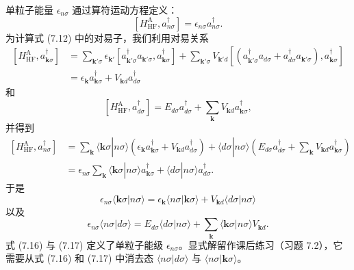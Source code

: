单粒子能量 $\epsilon_{n\sigma}$ 通过算符运动方程定义：
\begin{equation*}
\left[H_{\mathrm{HF}}^{\mathrm{A}},a_{n\sigma}^{\dagger}\right]=\epsilon_{n\sigma}a_{n\sigma}^{\dagger}.\tag{7.12}
\end{equation*}
为计算式 (7.12) 中的对易子，我们利用对易关系
\begin{equation*}
\begin{aligned}
\left[H_{\mathrm{HF}}^{\mathrm{A}},a_{\mathbf{k}\sigma}^{\dagger}\right]&=\sum_{\mathbf{k}'\sigma}\epsilon_{\mathbf{k}'}\left[a_{\mathbf{k}'\sigma}^{\dagger}a_{\mathbf{k}'\sigma},a_{\mathbf{k}\sigma}^{\dagger}\right]+\sum_{\mathbf{k}'\sigma}V_{\mathbf{k}'d}\left[\left(a_{\mathbf{k}'\sigma}^{\dagger}a_{d\sigma}+a_{d\sigma}^{\dagger}a_{\mathbf{k}'\sigma}\right),a_{\mathbf{k}\sigma}^{\dagger}\right]\\
&=\epsilon_{\mathbf{k}}a_{\mathbf{k}\sigma}^{\dagger}+V_{\mathbf{k}d}a_{d\sigma}^{\dagger}
\end{aligned}\tag{7.13}
\end{equation*}
和
\begin{equation*}
\left[H_{\mathrm{HF}}^{\mathrm{A}},a_{d\sigma}^{\dagger}\right]=E_{d\sigma}a_{d\sigma}^{\dagger}+\sum_{\mathbf{k}}V_{\mathbf{k}d}a_{\mathbf{k}\sigma}^{\dagger},\tag{7.14}
\end{equation*}
并得到
\begin{equation*}
\begin{aligned}
\left[H_{\mathrm{HF}}^{\mathrm{A}},a_{n\sigma}^{\dagger}\right]&=\sum_{\mathbf{k}}\langle\mathbf{k}\sigma|n\sigma\rangle\left(\epsilon_{\mathbf{k}}a_{\mathbf{k}\sigma}^{\dagger}+V_{\mathbf{k}d}a_{d\sigma}^{\dagger}\right)+\langle d\sigma|n\sigma\rangle\left(E_{d\sigma}a_{d\sigma}^{\dagger}+\sum_{\mathbf{k}}V_{\mathbf{k}d}a_{\mathbf{k}\sigma}^{\dagger}\right)\\
&=\epsilon_{n\sigma}\sum_{\mathbf{k}}\langle\mathbf{k}\sigma|n\sigma\rangle a_{\mathbf{k}\sigma}^{\dagger}+\langle d\sigma|n\sigma\rangle a_{d\sigma}^{\dagger}.
\end{aligned}\tag{7.15}
\end{equation*}
于是
\begin{equation*}
\epsilon_{n\sigma}\langle\mathbf{k}\sigma|n\sigma\rangle=\epsilon_{\mathbf{k}}\langle n\sigma|\mathbf{k}\sigma\rangle+V_{\mathbf{k}d}\langle d\sigma|n\sigma\rangle\tag{7.16}
\end{equation*}
以及
\begin{equation*}
\epsilon_{n\sigma}\langle n\sigma|d\sigma\rangle=E_{d\sigma}\langle d\sigma|n\sigma\rangle+\sum_{\mathbf{k}}\langle\mathbf{k}\sigma|n\sigma\rangle V_{\mathbf{k}d}.\tag{7.17}
\end{equation*}
式 (7.16) 与 (7.17) 定义了单粒子能级 $\epsilon_{n\sigma}$。显式解留作课后练习（习题 7.2），它需要从式 (7.16) 和 (7.17) 中消去态 $\langle n\sigma|d\sigma\rangle$ 与 $\langle n\sigma|\mathbf{k}\sigma\rangle$。

